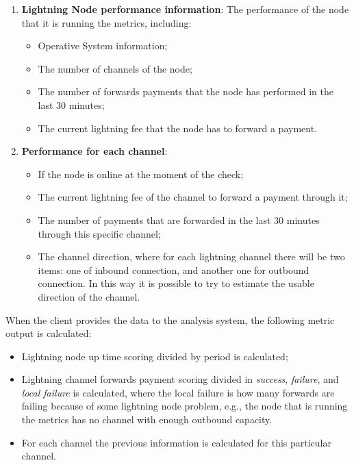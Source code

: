 \begin{enumerate}
    \item {\bf Lightning Node performance information}: The performance of the node that it is running
        the metrics, including:
        \begin{itemize}
           \item Operative System information;
           \item The number of channels of the node;
           \item The number of forwards payments that the node has performed in the 
               last 30 minutes;
           \item The current lightning fee that the node has to 
               forward a payment.
        \end{itemize}
    \item {\bf Performance for each channel}:
    \begin{itemize}
        \item If the node is online at the moment of the check;
        \item The current lightning fee of the channel to forward a payment through it;
        \item The number of payments that are forwarded in the last 30 minutes through this specific 
            channel;
        \item The channel direction, where for each lightning channel there will be two items: one of 
            inbound connection, and another one for outbound connection. In this way it is possible to 
            try to estimate the usable direction of the channel.
    \end{itemize}
\end{enumerate}

When the client provides the data to the analysis system, the following metric 
output is calculated:

\begin{itemize}
    \item Lightning node up time scoring divided by period is calculated;
    \item Lightning channel forwards payment scoring divided in \emph{success}, \emph{failure}, and \emph{local failure}
        is calculated, where the local failure is how many forwards are failing because of some lightning node problem,
        e.g., the node that is running the metrics has no channel with enough outbound capacity. 
    \item For each channel the previous information is calculated for this particular channel.
\end{itemize}


